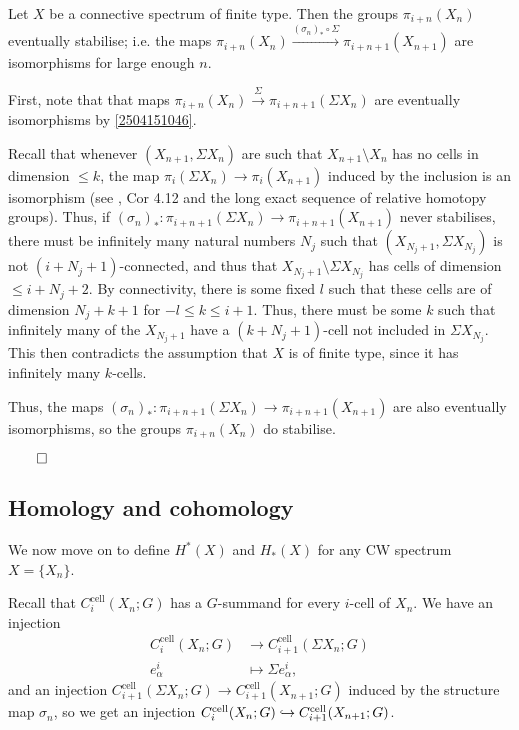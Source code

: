 \documentclass{MetricNotes2023}
\def\inj{\ensuremath\hookrightarrow}
\def\done{\begin{flushright}\vspace{-4.35ex}\(\qed\)\end{flushright}}
\begin{document}
\begin{lemma}\label{2504151105}
Let \(X\) be a connective spectrum of finite type. Then the groups \(\pi_{i+n}(X_n)\) eventually stabilise; i.e. the maps \(\pi_{i+n}(X_n) \xrightarrow{(\sigma_n)_*\circ \Sigma} \pi_{i+n+1}(X_{n+1})\) are isomorphisms for large enough \(n\). 
\end{lemma}

\begin{ourproof}
First, note that that maps \(\pi_{i+n}(X_n) \xrightarrow{\Sigma} \pi_{i+n+1}(\Sigma X_n)\) are eventually isomorphisms by \ref{2504151046}. 

Recall that whenever \((X_{n+1}, \Sigma X_n)\) are such that \(X_{n+1}\setminus X_n\) has no cells in dimension \(\leq k\), the map \(\pi_i(\Sigma X_n)\to \pi_i(X_{n+1})\) induced by the inclusion is an isomorphism (see \autocite{hatcher}, Cor 4.12 and the long exact sequence of relative homotopy groups). Thus, if \((\sigma_n)_* : \pi_{i+n+1}(\Sigma X_n)\to \pi_{i+n+1}(X_{n+1})\) never stabilises, there must be infinitely many natural numbers \(N_j\) such that \((X_{N_j+1}, \Sigma X_{N_j})\) is not \((i+N_j+1)\)-connected, and thus that \(X_{N_j+1}\setminus \Sigma X_{N_j}\) has cells of dimension \(\leq i+N_j+2\). By connectivity, there is some fixed \(l\) such that these cells are of dimension \(N_j+k+1\) for \(-l\leq k \leq i+1\). Thus, there must be some \(k\) such that infinitely many of the \(X_{N_j+1}\) have a \((k+N_j+1)\)-cell not included in \(\Sigma X_{N_j}\). This then contradicts the assumption that \(X\) is of finite type, since it has infinitely many \(k\)-cells. 

Thus, the maps \((\sigma_n)_* : \pi_{i+n+1}(\Sigma X_n)\to \pi_{i+n+1}(X_{n+1})\) are also eventually isomorphisms, so the groups \(\pi_{i+n}(X_n)\) do stabilise.\done
\end{ourproof}

\subsection{Homology and cohomology}


We now move on to define \(H^*(X)\) and \(H_*(X)\) for any CW spectrum \(X=\{X_n\}\).

Recall that \(C^\text{cell}_i(X_n; G)\) has a \(G\)-summand for every \(i\)-cell of \(X_n\). We have an injection
\begin{align*}
C_i^\text{cell}(X_n;G) &\to C_{i+1}^\text{cell}(\Sigma X_n; G)\\
e^i_\alpha &\mapsto \Sigma e^i_\alpha,
\end{align*}
and an injection \(C^\text{cell}_{i+1}(\Sigma X_n; G)\to C^\text{cell}_{i+1}(X_{n+1}; G)\) induced by the structure map \(\sigma_n\), so we get an injection \(C^\text{cell}_i(X_n;G)\inj C^\text{cell}_{i+1}(X_{n+1};G)\).
\end{document}
